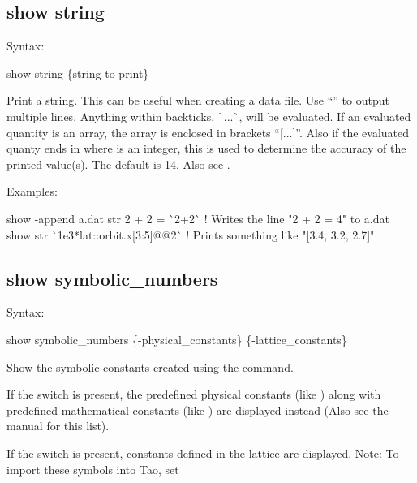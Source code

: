 {{{{{{{{{%

\subsection{show string}
\label{s:show.string}

Syntax:
\begin{example}
  show string \{string-to-print\}
\end{example}

Print a string. This can be useful when creating a data file. Use ``'' to output multiple
lines. Anything within backticks, \`{}...\`{}, will be evaluated. If an evaluated quantity is an
array, the array is enclosed in brackets ``[...]''. Also if the evaluated quanty ends in
 where  is an integer, this is used to determine the accuracy of the printed
value(s). The default is 14. Also see .

Examples:
\begin{example}
  show -append a.dat str 2 + 2 = \`{}2+2\`{} ! Writes the line "2 + 2 = 4" to a.dat
  show str \`{}1e3*lat::orbit.x[3:5]@@2\`{}  ! Prints something like "[3.4, 3.2, 2.7]"
\end{example}


\subsection{show symbolic_numbers}
\label{s:show.symbolic}

Syntax:
\begin{example}
  show symbolic_numbers \{-physical_constants\} \{-lattice_constants\}
\end{example}

Show the symbolic constants created using the  command. 

If the  switch is present, the predefined physical constants (like
) along with predefined mathematical constants (like ) are displayed instead
(Also see the \bmad manual for this list).

If the  switch is present, constants defined in the lattice are displayed.
Note: To import these symbols into Tao, set \vn{global%
\vn{-symbol_import} switch on the startup command line). The default is to not import lattice
symbols.

}}}}}}}}}}
